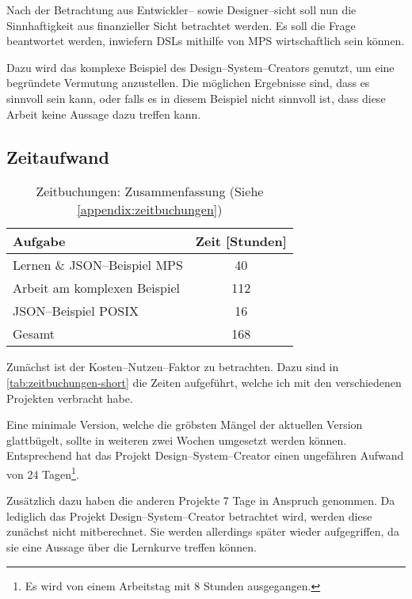 Nach der Betrachtung aus Entwickler-- sowie Designer--sicht soll nun die Sinnhaftigkeit aus finanzieller Sicht betrachtet werden.
Es soll die Frage beantwortet werden, inwiefern \acp{DSL} mithilfe von \ac{MPS} wirtschaftlich sein können.

Dazu wird das komplexe Beispiel des Design--System--Creators genutzt, um eine begründete Vermutung anzustellen.
Die möglichen Ergebnisse sind, dass es sinnvoll sein kann, oder falls es in diesem Beispiel nicht sinnvoll ist, dass diese Arbeit keine Aussage dazu treffen kann.

\subsection{Zeitaufwand}\label{subsec:zeitaufwand}
\begin{table}[ht]
    \centering
    \begin{tabular}{|l|c|}
        \hline
        Aufgabe                                & Zeit [Stunden] \\
        \hline
        \hline
        Lernen \& \ac{JSON}--Beispiel \ac{MPS} & 40             \\
        \hline
        Arbeit am komplexen Beispiel           & 112            \\
        \hline
        \ac{JSON}--Beispiel \ac{POSIX}         & 16             \\
        \hline
        \hline
        Gesamt                                 & 168            \\
        \hline
    \end{tabular}
    \caption{Zeitbuchungen: Zusammenfassung (Siehe \autoref{appendix:zeitbuchungen})}
    \label{tab:zeitbuchungen-short}
\end{table}
Zunächst ist der Kosten--Nutzen--Faktor zu betrachten.
Dazu sind in \autoref{tab:zeitbuchungen-short} die Zeiten aufgeführt, welche ich mit den verschiedenen Projekten verbracht habe.

Eine minimale Version, welche die gröbsten Mängel der aktuellen Version glattbügelt, sollte in weiteren zwei Wochen umgesetzt werden können.
Entsprechend hat das Projekt Design--System--Creator einen ungefähren Aufwand von 24 Tagen\footnote{Es wird von einem Arbeitstag mit 8 Stunden ausgegangen.}.

Zusätzlich dazu haben die anderen Projekte 7 Tage in Anspruch genommen.
Da lediglich das Projekt Design--System--Creator betrachtet wird, werden diese zunächst nicht mitberechnet.
Sie werden allerdings später wieder aufgegriffen, da sie eine Aussage über die Lernkurve treffen können.


